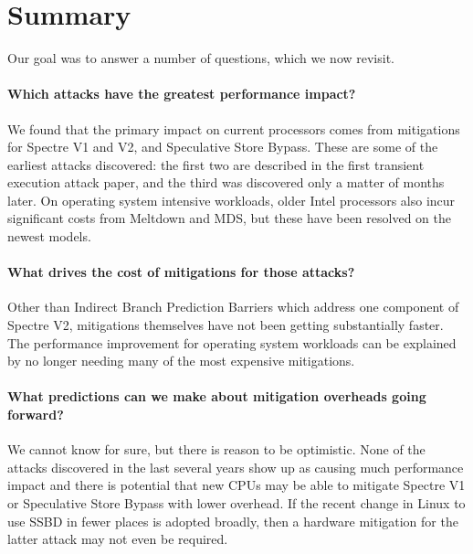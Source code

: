 \section{Summary}

Our goal was to answer a number of questions, which we now revisit.

\paragraph{Which attacks have the greatest performance impact?}

We found that the primary impact on current processors comes from mitigations for Spectre V1 and V2, and Speculative Store Bypass.
These are some of the earliest attacks discovered: the first two are described in the first transient execution attack paper, and the third was discovered only a matter of months later.
On operating system intensive workloads, older Intel processors also incur significant costs from Meltdown and MDS, but these have been resolved on the newest models.

\paragraph{What drives the cost of mitigations for those attacks?}

Other than Indirect Branch Prediction Barriers which address one component of Spectre V2, mitigations themselves have not been getting substantially faster.
The performance improvement for operating system workloads can be explained by no longer needing many of the most expensive mitigations.

\paragraph{What predictions can we make about mitigation overheads going forward?}

We cannot know for sure, but there is reason to be optimistic.
None of the attacks discovered in the last several years show up as causing much performance impact and there is potential that new CPUs may be able to mitigate Spectre V1 or Speculative Store Bypass with lower overhead.
If the recent change in Linux to use SSBD in fewer places is adopted broadly, then a hardware mitigation for the latter attack may not even be required.
